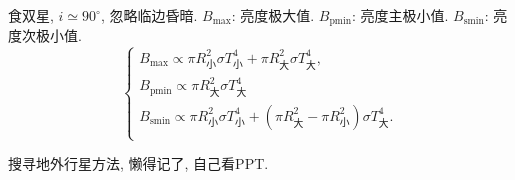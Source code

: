 食双星, $i\simeq90^{\circ}$, 忽略临边昏暗. $B_\text{max}$: 亮度极大值. $B_\text{pmin}$: 亮度主极小值. $B_\text{smin}$: 亮度次极小值.
\begin{equation*}
    \begin{cases}
        B_\text{max} \propto \pi R_\text{小}^2 \sigma T_\text{小}^4 + \pi R_\text{大}^2 \sigma T_\text{大}^4, \\
        B_\text{pmin} \propto \pi R_\text{大}^2 \sigma T_\text{大}^4 \\
        B_\text{smin} \propto \pi R_\text{小}^2 \sigma T_\text{小}^4 + (\pi R_\text{大}^2 - \pi R_\text{小}^2) \sigma T_\text{大}^4. \\
    \end{cases}
\end{equation*}

搜寻地外行星方法, 懒得记了, 自己看PPT.
